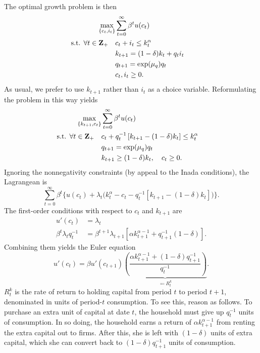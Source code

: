 \documentclass[11pt,letterpaper,reqno,oneside]{article}
\begin{document}
The optimal growth problem is then
%
\begin{align*}
	\max_{\{c_t,i_t\}}
	&\sum_{t=0}^\infty \beta^t u(c_t) &
	\\
	\text{s.t. $\forall t \in \mathbf{Z}_+$}\quad
	&c_t + i_t \leq k_t^\alpha
	\\
	&k_{t+1} = (1-\delta) k_t + q_t i_t 
	\\
	&q_{t+1} = \exp(\mu_q) q_t
	\\
	&c_t, i_t \geq 0 .
\end{align*}
%
As usual, we prefer to use $k_{t+1}$ rather than $i_t$ as a choice variable. Reformulating the problem in this way yields
%
\begin{align*}
	\max_{\{k_{t+1},c_t\}}
	&\sum_{t=0}^\infty \beta^t u(c_t) &
	\\
	\text{s.t. $\forall t \in \mathbf{Z}_+$}\quad
	&c_t + q_t^{-1} \left[ k_{t+1} - (1-\delta) k_t \right] \leq k_t^\alpha
	\\
	&q_{t+1} = \exp(\mu_q) q_t
	\\
	&k_{t+1} \geq (1-\delta) k_t, \quad c_t \geq 0 .
\end{align*}
%
Ignoring the nonnegativity constraints (by appeal to the Inada conditions), the Lagrangean is
%
\begin{equation*}
	\sum_{t=0}^\infty \beta^t \bigl\{
	u(c_t) + \lambda_t \bigl(
	k_t^\alpha - c_t - q_t^{-1} \left[ k_{t+1}-(1-\delta)k_t \right] \bigr)
	\bigr\} .
\end{equation*}
%
The first-order conditions with respect to $c_t$ and $k_{t+1}$ are
%
\begin{align*}
	u'(c_t) 
	&= \lambda_t
	\\
	\beta^t \lambda_t q_t^{-1} 
	&= \beta^{t+1} \lambda_{t+1} 
	\left[ \alpha k_{t+1}^{\alpha-1} + q_{t+1}^{-1} (1-\delta) \right] .
\end{align*}
%
Combining them yields the Euler equation
%
\begin{equation*}
	u'(c_t)  
	= \beta u'(c_{t+1})
	\underbrace{ \left( \frac{ \alpha k_{t+1}^{\alpha-1} + (1-\delta) q_{t+1}^{-1} }
	{ q_t^{-1} } \right) }_{\eqqcolon R^k_t} .
\end{equation*}
%
$R^k_t$ is the rate of return to holding capital from period $t$ to period $t+1$, denominated in units of period-$t$ consumption. To see this, reason as follows. To purchase an extra unit of capital at date $t$, the household must give up $q_t^{-1}$ units of consumption. In so doing, the household earns a return of $\alpha k_{t+1}^{\alpha-1}$ from renting the extra capital out to firms. After this, she is left with $(1-\delta)$ units of extra capital, which she can convert back to $(1-\delta) q_{t+1}^{-1}$ units of consumption.
\end{document}
